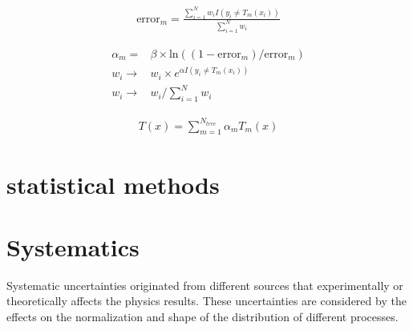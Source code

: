 \begin{align}\label{Equ.errorBDT} 
\textrm{error}_{m}=\frac{\sum_{i=1}^{N}w_{i}I(y_{i}\neq T_{m}(x_{i}))}{\sum_{i=1}^{N}w_{i}} 
\end{align}


\begin{align}\label{Equ.boostingweight} 
\alpha_{m}=&\beta\times \textrm{ln}((1-\textrm{error}_{m})/\textrm{error}_{m})\\
w_{i}\rightarrow &w_{i}\times e^{\alpha I(y_{i}\neq T_{m}(x_{i}))} \\
w_{i}\rightarrow &w_{i}/\sum_{i=1}^{N}w_{i}
\end{align}

\begin{align}\label{Equ.boostingeventweight} 
T(x)=\sum_{m=1}^{N_{tree}}\alpha_{m}T_{m}(x)
\end{align}



\section{statistical methods}

\section{Systematics}
Systematic uncertainties originated from different sources that experimentally or theoretically affects the physics results. These uncertainties are considered by the effects on the normalization and shape of the distribution of different processes. 

